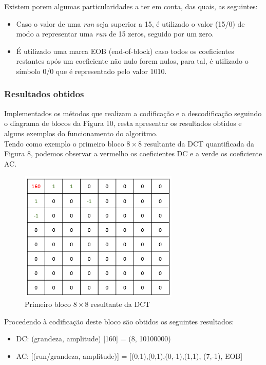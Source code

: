 \documentclass[12pt,a4paper]{article}
\begin{document}
Existem porem algumas particularidades a ter em conta, das quais, as seguintes:

\begin{itemize}
\item Caso o valor de uma \textit{run} seja superior a 15, é utilizado o valor (15/0) de modo a representar uma \textit{run} de 15 zeros, seguido por um zero.
\item É utilizado uma marca EOB (end-of-block) caso todos os coeficientes restantes após um coeficiente não nulo forem nulos, para tal, é utilizado o símbolo 0/0 que é representado pelo valor 1010.
\end{itemize}
\newpage
\subsubsection{Resultados obtidos}
Implementados os métodos que realizam a codificação e a descodificação seguindo o diagrama de blocos da Figura 10, resta apresentar os resultados obtidos e alguns exemplos do funcionamento do algoritmo.\\
Tendo como exemplo o primeiro bloco $8\times 8$ resultante da DCT quantificada da Figura 8, podemos observar a vermelho os coeficientes DC e a verde os coeficiente AC.

\begin{figure}[h]
\centering
\includegraphics[width=.5\linewidth]{imagens/bloco.png}
\caption{Primeiro bloco $8\times 8$ resultante da DCT}
\end{figure}

Procedendo à codificação deste bloco são obtidos os seguintes resultados:

\begin{itemize}
\item DC: (grandeza, amplitude) [160] = (8, 10100000)
\item AC: [(run/grandeza, amplitude)] = [(0,1),(0,1),(0,-1),(1,1), (7,-1), EOB]
\end{itemize}
\end{document}
